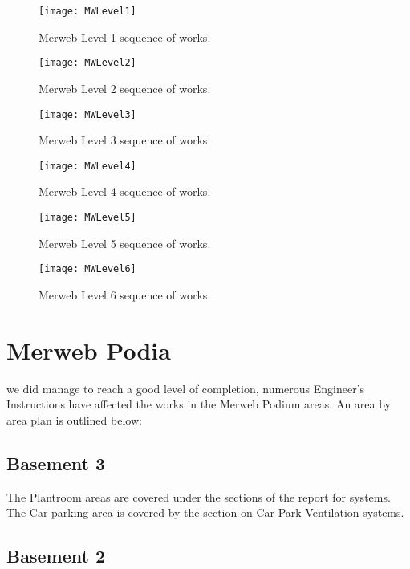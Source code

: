 %
\begin{figure*}[htbp]
 \texttt{[image: MWLevel1]}
  \caption{Merweb Level 1 sequence of works.}
  \label{fig:level7}
\end{figure*}

%
\begin{figure*}[htbp]
 \texttt{[image: MWLevel2]}
  \caption{Merweb Level 2 sequence of works.}
  \label{fig:MWlevel2}
\end{figure*}

%
\begin{figure*}[htbp]
 \texttt{[image: MWLevel3]}
  \caption{Merweb Level 3 sequence of works.}
  \label{fig:MWlevel3}
\end{figure*}


%
\begin{figure*}[htbp]
 \texttt{[image: MWLevel4]}
  \caption{Merweb Level 4 sequence of works.}
  \label{fig:MWlevel4}
\end{figure*}


%
\begin{figure*}[htbp]
 \texttt{[image: MWLevel5]}
  \caption{Merweb Level 5 sequence of works.}
  \label{fig:MWlevel2}
\end{figure*}


%
\begin{figure*}[htbp]
 \texttt{[image: MWLevel6]}
  \caption{Merweb Level 6 sequence of works.}
  \label{fig:MWlevel6}
\end{figure*}

\chapter{Merweb Podia}

 we did manage to reach a good level of completion, numerous Engineer's Instructions have affected the works in the Merweb Podium areas. An area by area plan is outlined below:

\section{Basement 3}

The Plantroom areas are covered under the sections of the report for systems. The Car parking area is covered by the section on Car Park Ventilation systems.
\section{Basement 2}

